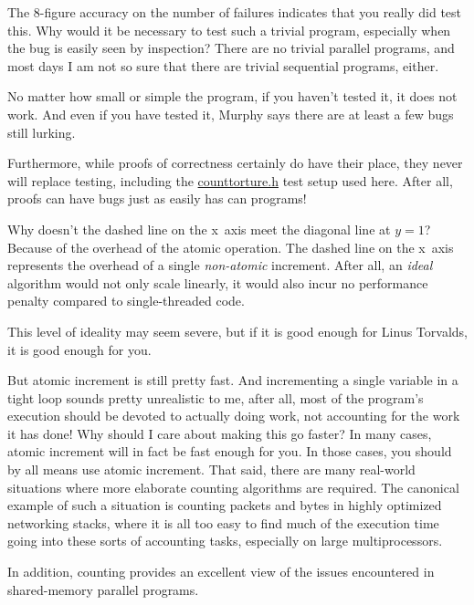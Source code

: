 \QuickQ{}
	The 8-figure accuracy on the number of failures indicates
	that you really did test this.
	Why would it be necessary to test such a trivial program,
	especially when the bug is easily seen by inspection?
\QuickA{}
	There are no trivial parallel programs, and most days I am
	not so sure that there are trivial sequential programs, either.

	No matter how small or simple the program, if you haven't tested
	it, it does not work.
	And even if you have tested it, Murphy says there are at least a
	few bugs still lurking.

	Furthermore, while proofs of correctness certainly do have their
	place, they never will replace testing, including the
	\url{counttorture.h} test setup used here.
	After all, proofs can have bugs just as easily has can programs!

\QuickQ{}
	Why doesn't the dashed line on the x~axis meet the 
	diagonal line at $y=1$?
\QuickA{}
	Because of the overhead of the atomic operation.
	The dashed line on the x~axis represents the overhead of
	a single \emph{non-atomic} increment.
	After all, an \emph{ideal} algorithm would not only scale
	linearly, it would also incur no performance penalty compared
	to single-threaded code.

	This level of ideality may seem severe, but if it is good
	enough for Linus Torvalds, it is good enough for you.

\QuickQ{}
	But atomic increment is still pretty fast.
	And incrementing a single variable in a tight loop sounds
	pretty unrealistic to me, after all, most of the program's
	execution should be devoted to actually doing work, not accounting
	for the work it has done!
	Why should I care about making this go faster?
\QuickA{}
	In many cases, atomic increment will in fact be fast enough
	for you.
	In those cases, you should by all means use atomic increment.
	That said, there are many real-world situations where
	more elaborate counting algorithms are required.
	The canonical example of such a situation is counting packets
	and bytes in highly optimized networking stacks, where it is
	all too easy to find much of the execution time going into
	these sorts of accounting tasks, especially on large
	multiprocessors.

	In addition, counting provides an excellent view of the
	issues encountered in shared-memory parallel programs.

